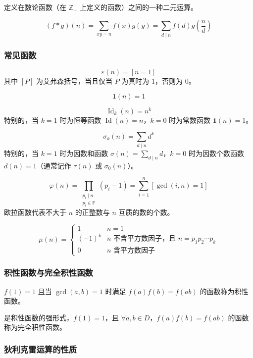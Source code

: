 定义在数论函数（在 $\mathbb{Z_+}$ 上定义的函数）之间的一种二元运算。

\[
(f * g)(n) = \sum_{xy=n} f(x)g(y) = \sum_{d \mid n} f(d)g\!\left(\frac{n}{d}\right)
\]

\subsubsection{常见函数}

\[
\varepsilon(n) = [n = 1]
\]
其中 $[P]$ 为艾弗森括号，当且仅当 $P$ 为真时为 $1$，否则为 $0$。

\[
\mathbf{1}(n) = 1
\]

\[
\operatorname{Id}_k(n) = n^k
\]
特别的，当 $k = 1$ 时为恒等函数 $\operatorname{Id}(n) = n$，$k = 0$ 时为常数函数 $\mathbf{1}(n) = 1$。

\[
\sigma_k(n) = \sum_{d\mid n} d^{k}
\]
特别的，当 $k = 1$ 时为因数和函数 $\sigma(n) = \sum_{d\mid n} d$，$k = 0$ 时为因数个数函数 $d(n) = 1$（通常记作 $\tau(n)$ 或 $\sigma_0(n)$）。

\[
\varphi(n) = \prod_{\substack{p_i \mid n \\ p_i \in \mathbb{P}}} (p_i - 1) = \sum_{i=1}^{n} [\gcd(i, n)=1]
\]
欧拉函数代表不大于 $n$ 的正整数与 $n$ 互质的数的个数。

\[
\mu(n) = 
\begin{cases}
1 & n = 1 \\
(-1)^k & n \text{ 不含平方数因子，且 } n = p_1 p_2 \cdots p_k \\
0 & n \text{ 含平方数因子}
\end{cases}
\]

\subsubsection{积性函数与完全积性函数}

$f(1) = 1$ 且当 $\gcd(a, b) = 1$ 时满足 $f(a)f(b) = f(ab)$ 的函数称为积性函数。

是积性函数的强形式，$f(1) = 1$，且 $\forall a, b \in D$，$f(a)f(b) = f(ab)$ 的函数称为完全积性函数。

\subsubsection{狄利克雷运算的性质}

